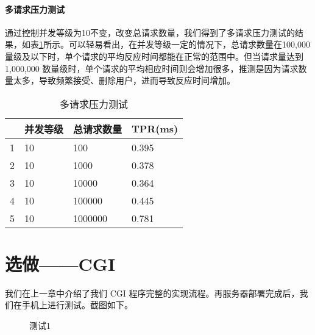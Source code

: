 \paragraph*{多请求压力测试} 通过控制并发等级为10不变，改变总请求数量，我们得到了多请求压力测试的结果，如表\ref{tab:multiple}所示。可以轻易看出，在并发等级一定的情况下，总请求数量在100,000量级及以下时，单个请求的平均反应时间都能在正常的范围中。但当请求量达到1,000,000 数量级时，单个请求的平均相应时间则会增加很多，推测是因为请求数量太多，导致频繁接受、删除用户，进而导致反应时间增加。

\begin{table}[htbp!]
    \centering
    \begin{tabular}{llll}\hline
      & 并发等级 & 总请求数量 & TPR(ms)   \\\hline
    1 & 10      & 100       & 0.395 \\
    2 & 10      & 1000      & 0.378 \\
    3 & 10      & 10000     & 0.364\\
    4 & 10      & 100000    & 0.445\\
    5 & 10      & 1000000   & 0.781\\
    \hline
    \end{tabular}
    \caption{多请求压力测试}\label{tab:multiple}
\end{table}

\section{选做——CGI}

我们在上一章中介绍了我们 CGI 程序完整的实现流程。再服务器部署完成后，我们在手机上进行测试。截图如下。

\begin{figure}[htbp!]
    \centering
    \caption{测试1}
\end{figure}



